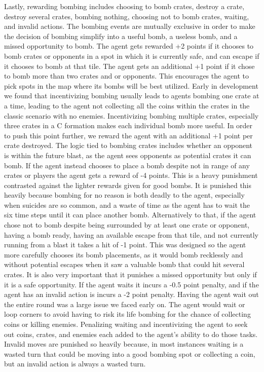 \documentclass[article, 10pt]{IEEEtran}
\begin{document}
Lastly, rewarding bombing includes choosing to bomb crates, destroy a crate, destroy several crates, bombing nothing, choosing not to bomb crates, waiting, and invalid actions. The bombing events are mutually exclusive in order to make the decision of bombing simplify into a useful bomb, a useless bomb, and a missed opportunity to bomb. The agent gets rewarded +2 points if it chooses to bomb crates or opponents in a spot in which it is currently safe, and can escape if it chooses to bomb at that tile. The agent gets an additional +1 point if it chose to bomb more than two crates and or opponents. This encourages the agent to pick spots in the map where its bombs will be best utilized. Early in development we found that incentivizing bombing usually leads to agents bombing one crate at a time, leading to the agent not collecting all the coins within the crates in the classic scenario with no enemies. Incentivizing bombing multiple crates, especially three crates in a C formation makes each individual bomb more useful. In order to push this point further, we reward the agent with an additional +1 point per crate destroyed. The logic tied to bombing crates includes whether an opponent is within the future blast, as the agent sees opponents as potential crates it can bomb. If the agent instead chooses to place a bomb despite not in range of any crates or players the agent gets a reward of -4 points. This is a heavy punishment contrasted against the lighter rewards given for good bombs. It is punished this heavily because bombing for no reason is both deadly to the agent, especially when suicides are so common, and a waste of time as the agent has to wait the six time steps until it can place another bomb. Alternatively to that, if the agent chose not to bomb despite being surrounded by at least one crate or opponent, having a bomb ready, having an available escape from that tile, and not currently running from a blast it takes a hit of -1 point. This was designed so the agent more carefully chooses its bomb placements, as it would bomb recklessly and without potential escapes when it saw a valuable bomb that could hit several crates. It is also very important that it punishes a missed opportunity but only if it is a safe opportunity. If the agent waits it incurs a -0.5 point penalty, and if the agent has an invalid action is incurs a -2 point penalty. Having the agent wait out the entire round was a large issue we faced early on. The agent would wait or loop corners to avoid having to risk its life bombing for the chance of collecting coins or killing enemies. Penalizing waiting and incentivizing the agent to seek out coins, crates, and enemies each added to the agent's ability to do those tasks. Invalid moves are punished so heavily because, in most instances waiting is a wasted turn that could be moving into a good bombing spot or collecting a coin, but an invalid action is always a wasted turn. 
\end{document}
